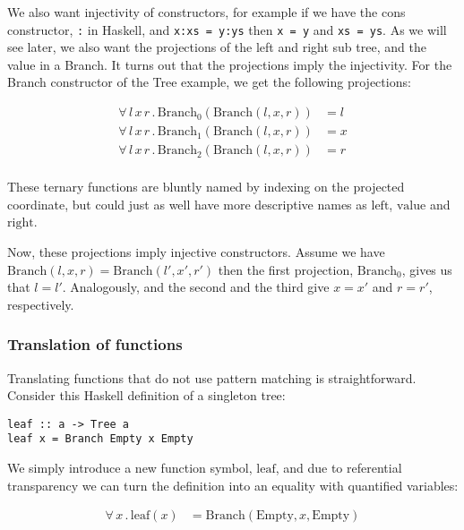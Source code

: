 We also want injectivity of constructors, for example if we have the
cons constructor, \verb;:; in Haskell, and \verb;x:xs = y:ys; then
\verb;x = y; and \verb;xs = ys;. As we will see later, we also want the
projections of the left and right sub tree, and the value in a Branch.
It turns out that the projections imply the injectivity. For the Branch
constructor of the Tree example, we get the following projections:

\begin{align*}
 \forall \, l \, x \, r \, . \,  \mathrm{Branch_{0}}(\mathrm{Branch}(l,x,r)) &  = l\\
 \forall \, l \, x \, r \, . \,  \mathrm{Branch_{1}}(\mathrm{Branch}(l,x,r)) &  = x\\
 \forall \, l \, x \, r \, . \,  \mathrm{Branch_{2}}(\mathrm{Branch}(l,x,r)) &  = r\\
\end{align*}

These ternary functions are bluntly named by indexing on the projected
coordinate, but could just as well have more descriptive names as
$\mathrm{left}$, $\mathrm{value}$ and $\mathrm{right}$.

Now, these projections imply injective constructors. Assume we have
$\mathrm{Branch}(l,x,r) = \mathrm{Branch}(l',x',r')$ then the first
projection, $\mathrm{Branch_0}$, gives us that $l=l'$. Analogously,
and the second and the third give $x=x'$ and $r=r'$, respectively.

\subsubsection{Translation of functions}

Translating functions that do not use pattern matching is
straightforward. Consider this Haskell definition of a singleton tree:

\begin{verbatim}
leaf :: a -> Tree a
leaf x = Branch Empty x Empty
\end{verbatim}

We simply introduce a new function symbol, $\mathrm{leaf}$, and due
to referential transparency we can turn the definition into an
equality with quantified variables:

\begin{align*}
 \forall \, x \, . \, \mathrm{leaf}(x) &  = \mathrm{Branch}(\mathrm{Empty},x,\mathrm{Empty})\\
\end{align*}


